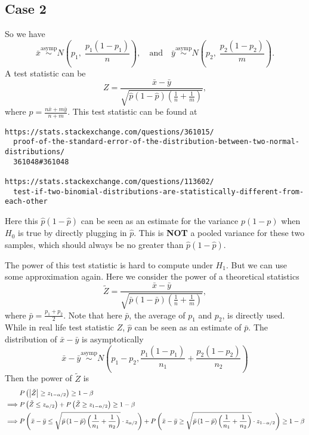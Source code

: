 \documentclass[a4paper,12pt]{article}
\begin{document}
\subsection{Case 2}
\label{sec:case-2}

So we have
\[
  \bar{x} \overset{\mathrm{asymp}}{\sim} N\left(p_1,\;\frac{p_1\left(1 - p_1\right)}{n}\right)
  ,\quad\text{and}\quad
  \bar{y} \overset{\mathrm{asymp}}{\sim} N\left(p_2,\;\frac{p_2\left(1 - p_2\right)}{m}\right)
  .
\]
A test statistic can be
\[
  Z = \frac{\bar{x} - \bar{y}}{
    \sqrt{
      \hat{p}\left(1 - \hat{p}\right)
      \left(\frac{1}{n} + \frac{1}{m}\right)
    }
  }
  ,
\]
where $\hat{p} = \frac{n\bar{x} + m\bar{y}}{n + m}$. This test statistic can be found at
\begin{verbatim}
https://stats.stackexchange.com/questions/361015/
  proof-of-the-standard-error-of-the-distribution-between-two-normal-distributions/
  361048#361048

https://stats.stackexchange.com/questions/113602/
  test-if-two-binomial-distributions-are-statistically-different-from-each-other
\end{verbatim}
Here this $\hat{p}\left(1 - \hat{p}\right)$ can be seen as an estimate for the variance $p\left(1 - p\right)$ when $H_0$ is true by directly plugging in $\hat{p}$. This is \textbf{NOT} a pooled variance for these two samples, which should always be no greater than $\hat{p}\left(1 - \hat{p}\right)$.
\par
The power of this test statistic is hard to compute under $H_1$. But we can use some approximation again. Here we consider the power of a {\color{red}theoretical} statistics
\[
  \tilde{Z} = \frac{\bar{x} - \bar{y}}{
    \sqrt{
      \bar{p}\left(1 - \bar{p}\right)
      \left(\frac{1}{n} + \frac{1}{m}\right)
    }
  }
  ,
\]
where $\bar{p} = \frac{p_1 + p_2}{2}$. Note that here $\bar{p}$, the average of $p_1$ and $p_2$, is directly used. While in real life test statistic $Z$, $\hat{p}$ can be seen as an estimate of $\bar{p}$. The distribution of $\bar{x} - \bar{y}$ is asymptotically
\[
  \bar{x} - \bar{y} \overset{\mathrm{asymp}}{\sim} N\left(
    p_1 - p_2,
    \frac{p_1\left(1 - p_1\right)}{n_1}
    + \frac{p_2\left(1 - p_2\right)}{n_2}
  \right)
\]
Then the power of $\tilde{Z}$ is
\[\small
  \begin{aligned}
    & P\left(\left|\tilde{Z}\right| \geq z_{1 - \alpha / 2}\right) \geq 1 - \beta    \\
    \implies & P\left(\tilde{Z} \leq z_{\alpha / 2}\right)
    + P\left(\tilde{Z} \geq z_{1 - \alpha / 2}\right)
    \geq 1 - \beta    \\
    \implies &
    P\left(
      \bar{x} - \bar{y}
      \leq
      \sqrt{\bar{p}\left(1 - \bar{p}\right)\left(\frac{1}{n_1} + \frac{1}{n_2}\right)}
      \cdot z_{\alpha / 2}
    \right)
    + P\left(
      \bar{x} - \bar{y}
      \geq
      \sqrt{\bar{p}\left(1 - \bar{p}\right)\left(\frac{1}{n_1} + \frac{1}{n_2}\right)}
      \cdot z_{1 - \alpha / 2}
    \right)
    \geq 1 - \beta
  \end{aligned}
\]
\end{document}

